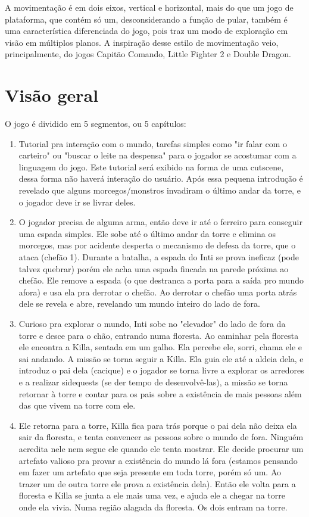 \documentclass[12pt]{article}
\begin{document}
A movimentação é em dois eixos, vertical e horizontal, mais do que um jogo de
plataforma, que contém só um, desconsiderando a função de pular, também é uma
característica diferenciada do jogo, pois traz um modo de exploração em visão
em múltiplos planos. A inspiração desse estilo de movimentação veio,
principalmente, do jogos Capitão Comando, Little Fighter 2 e Double Dragon.

\section{Visão geral}
O jogo é dividido em 5 segmentos, ou 5 capítulos:
\begin{enumerate}
\item Tutorial pra interação com o mundo, tarefas simples como "ir falar com o
carteiro" ou "buscar o leite na despensa" para o jogador se acostumar com a
linguagem do jogo. Este tutorial será exibido na forma de uma cutscene, dessa
forma não haverá interação do usuário.
Após essa pequena introdução é revelado que alguns morcegos/monstros invadiram
o último andar da torre, e o jogador deve ir se livrar deles.

\item O jogador precisa de alguma arma, então deve ir até o ferreiro para
conseguir uma espada simples. Ele sobe até o último andar da torre e elimina os
morcegos, mas por acidente desperta o mecanismo de defesa da torre, que o ataca
(chefão 1).
Durante a batalha, a espada do Inti se prova ineficaz (pode talvez quebrar)
porém ele acha uma espada fincada na parede próxima ao chefão. Ele remove a
espada (o que destranca a porta para a saída pro mundo afora) e usa ela pra
derrotar o chefão.
Ao derrotar o chefão uma porta atrás dele se revela e abre, revelando um mundo
inteiro do lado de fora.

\item Curioso pra explorar o mundo, Inti sobe no "elevador" do lado de fora da
torre e desce para o chão, entrando numa floresta.
Ao caminhar pela floresta ele encontra a Killa, sentada em um galho. Ela percebe
ele, sorri, chama ele e sai andando. A missão se torna seguir a Killa.
Ela guia ele até a aldeia dela, e introduz o pai dela (cacique) e o jogador se
torna livre a explorar os arredores e a realizar sidequests (se der tempo de
desenvolvê-las), a missão se torna retornar à torre e contar para os pais sobre
a existência de mais pessoas além das que vivem na torre com ele.

\item Ele retorna para a torre, Killa fica para trás porque o pai dela não deixa
ela sair da floresta, e tenta convencer as pessoas sobre o mundo de fora. Ninguém
acredita nele nem segue ele quando ele tenta mostrar. Ele decide procurar um
artefato valioso pra provar a existência do mundo lá fora (estamos pensando em
fazer um artefato que seja presente em toda torre, porém só um. Ao trazer um de
outra torre ele prova a existência dela).
Então ele volta para a floresta e Killa se junta a ele mais uma vez, e ajuda ele
a chegar na torre onde ela vivia. Numa região alagada da floresta. Os dois
entram na torre.


\end{enumerate}
\end{document}
